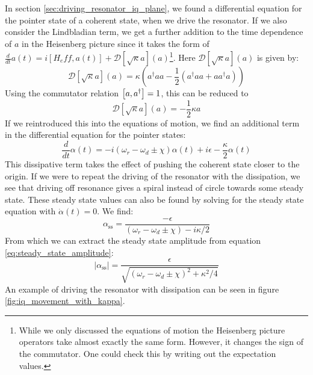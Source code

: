 In section \ref{sec:driving_resonator_iq_plane}, we found a differential equation for the pointer state of a coherent state, when we drive the resonator. If we also consider the Lindbladian term, we get a further addition to the time dependence of $a$ in the Heisenberg picture since it takes the form of $\frac{d}{dt}a(t) = i[H_eff, a(t)] +  \mathcal{D}[\sqrt{\kappa}a](a)$\footnote{While we only discussed the equations of motion the Heisenberg picture operators take almost exactly the same form. However, it changes the sign of the commutator. One could check this by writing out the expectation values.}. Here $\mathcal{D}[\sqrt{\kappa}a](a)$ is given by:
\begin{equation}
    \mathcal{D}[\sqrt{\kappa}a](a) = \kappa \left(a^\dagger a a -\frac12 \left(a^\dagger a a + a a^\dagger a \right) \right)
\end{equation}
Using the commutator relation $\comm{a}{a^\dagger} = 1$, this can be reduced to
\begin{equation}
    \mathcal{D}[\sqrt{\kappa}a](a) = -\frac{1}{2}\kappa a 
\end{equation}
If we reintroduced this into the equations of motion, we find an additional term in the differential equation for the pointer states:
\begin{equation}\label{eq:resonator_movement}
    \frac{d}{dt}\alpha(t) = - i \left(\omega_r - \omega_d \pm \chi\right) \alpha(t) + i\epsilon - \frac{\kappa}{2}\alpha(t) 
\end{equation}
This dissipative term takes the effect of pushing the coherent state closer to the origin. If we were to repeat the driving of the resonator with the dissipation, we see that driving off resonance gives a spiral instead of circle towards some steady state. These steady state values can also be found by solving for the steady state equation with $\dot{\alpha}(t) = 0$. We find:
\begin{equation}
    \alpha_{\text{ss}} = \frac{-\epsilon}{(\omega_r - \omega_d \pm \chi) - i \kappa / 2}
\end{equation}
From which we can extract the steady state amplitude from equation \ref{eq:steady_state_amplitude}:
\begin{equation}\label{eq:steady_state_amplitude}
    |\alpha_{\text{ss}}| = \frac{\epsilon}{\sqrt{(\omega_r - \omega_d \pm \chi)^2 + \kappa^2 / 4}}
\end{equation}
An example of driving the resonator with dissipation can be seen in figure \ref{fig:iq_movement_with_kappa}.

